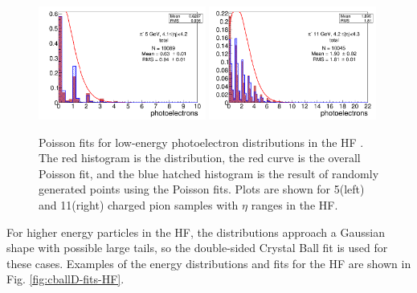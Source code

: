 \begin{figure}[hbtp]
\begin{center}
\includegraphics[width=0.49\textwidth]{figures/finaltaskreport_Page_5_Image_0004.png}
\includegraphics[width=0.49\textwidth]{figures/finaltaskreport_Page_5_Image_0005.png}
\caption{Poisson fits for low-energy photoelectron distributions in the HF \cite{Reza:HF}. The red histogram is the distribution, the red curve is the overall Poisson fit, and the blue hatched histogram is the result of randomly generated points using the Poisson fits. Plots are shown for 5\GeV (left) and 11\GeV (right) charged pion samples with $\eta$ ranges in the HF.}
\label{fig:poissonHF-fits}
\end{center}
\end{figure}

For higher energy particles in the HF, the distributions approach a Gaussian shape with possible large tails, so the double-sided Crystal Ball fit is used for these cases. Examples of the energy distributions and fits for the HF are shown in Fig. \ref{fig:cballD-fits-HF}.

